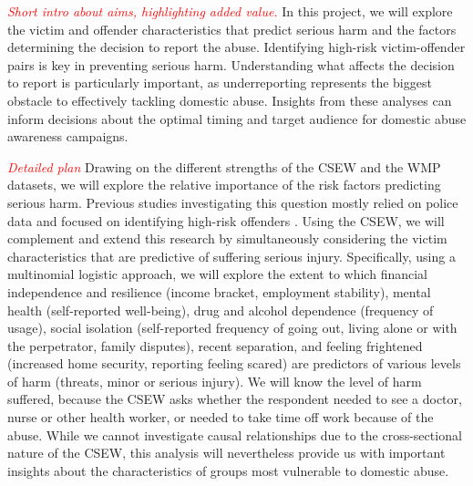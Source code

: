 \documentclass[11pt, a4paper]{article}
\begin{document}
 \textcolor{red}{\textit{Short intro about aims, highlighting added value.}} In this project, we will explore the victim and offender characteristics that predict serious harm and the factors determining the decision to report the abuse. Identifying high-risk victim-offender pairs is key in preventing serious harm. Understanding what affects the decision to report is particularly important, as underreporting represents the biggest obstacle to effectively tackling domestic abuse. Insights from these analyses can inform decisions about the optimal timing and target audience for domestic abuse awareness campaigns.
%
%
%
%

\textcolor{red}{\textit{Detailed plan}} Drawing on the different strengths of the CSEW and the WMP datasets, we will explore the relative importance of the risk factors predicting serious harm. Previous studies investigating this question mostly relied on police data and focused on identifying high-risk offenders \cite{thornton}. Using the CSEW, we will complement and extend this research by simultaneously considering the victim characteristics that are predictive of suffering serious injury. Specifically, using a multinomial logistic approach, we will explore the extent to which financial independence and resilience (income bracket, employment stability), mental health (self-reported well-being), drug and alcohol dependence (frequency of usage), social isolation (self-reported frequency of going out, living alone or with the perpetrator, family disputes), recent separation, and feeling frightened (increased home security, reporting feeling scared) are predictors of various levels of harm (threats, minor or serious injury). We will know the level of harm suffered, because the CSEW asks whether the respondent needed to see a doctor, nurse or other health worker, or needed to take time off work because of the abuse. While we cannot investigate causal relationships due to the cross-sectional nature of the CSEW, this analysis will nevertheless provide us with important insights about the characteristics of groups most vulnerable to domestic abuse.
\end{document}
